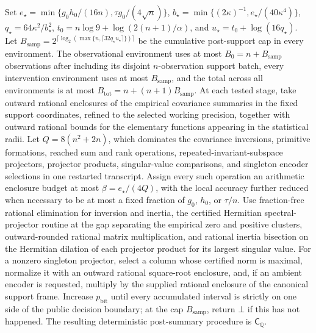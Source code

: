 Set \(e_{\star}=\min\{g_0h_0/(16n),\tau g_0/(4\sqrt n)\}\), \(b_{\star}=\min\{(2\kappa)^{-1},e_{\star}/(40\kappa^4)\}\), \(q_{\star}=64\kappa^2/b_{\star}^2\), \(t_0=n\log 9+\log(2(n+1)/\alpha)\), and \(u_{\star}=t_0+\log(16q_{\star})\). Let \(B_{\mathrm{samp}}=2^{\lceil\log_2(\max\{n,\lceil32q_{\star}u_{\star}\rceil\})\rceil}\) be the cumulative post-support cap in every environment. The observational environment uses at most \(B_0=n+B_{\mathrm{samp}}\) observations after including its disjoint \(n\)-observation support batch, every intervention environment uses at most \(B_{\mathrm{samp}}\), and the total across all environments is at most \(B_{\mathrm{tot}}=n+(n+1)B_{\mathrm{samp}}\).
At each tested stage, take outward rational enclosures of the empirical covariance summaries in the fixed support coordinates, refined to the selected working precision, together with outward rational bounds for the elementary functions appearing in the statistical radii. Let \(Q=8(n^2+2n)\), which dominates the covariance inversions, primitive formations, reached sum and rank operations, repeated-invariant-subspace projectors, projector products, singular-value comparisons, and singleton encoder selections in one restarted transcript. Assign every such operation an arithmetic enclosure budget at most \(\beta=e_{\star}/(4Q)\), with the local accuracy further reduced when necessary to be at most a fixed fraction of \(g_0\), \(h_0\), or \(\tau/n\). Use fraction-free rational elimination for inversion and inertia, the certified Hermitian spectral-projector routine at the gap separating the empirical zero and positive clusters, outward-rounded rational matrix multiplication, and rational inertia bisection on the Hermitian dilation of each projector product for its largest singular value. For a nonzero singleton projector, select a column whose certified norm is maximal, normalize it with an outward rational square-root enclosure, and, if an ambient encoder is requested, multiply by the supplied rational enclosure of the canonical support frame. Increase \(p_{\mathrm{bit}}\) until every accumulated interval is strictly on one side of the public decision boundary; at the cap \(B_{\mathrm{samp}}\), return \(\bot\) if this has not happened. The resulting deterministic post-summary procedure is \(\mathsf C_{\mathbb Q}\).
